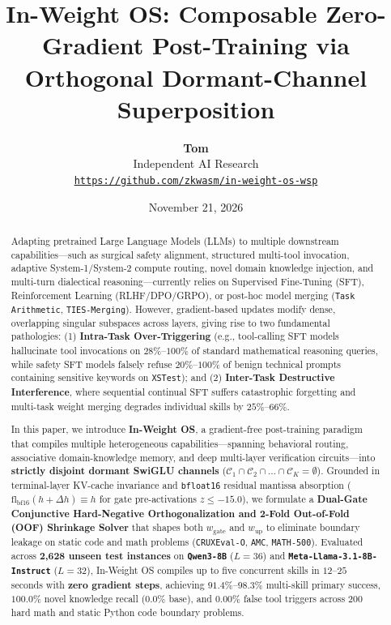 \documentclass[10pt,twocolumn]{article}
\title{\LARGE \textbf{In-Weight OS: Composable Zero-Gradient Post-Training via Orthogonal Dormant-Channel Superposition}}
\author{
  \textbf{Tom} \\
  Independent AI Research \\
  \texttt{\href{https://github.com/zkwasm/in-weight-os-wsp}{https://github.com/zkwasm/in-weight-os-wsp}}
}
\date{November 21, 2026}
\begin{document}
\maketitle

\begin{abstract}
Adapting pretrained Large Language Models (LLMs) to multiple downstream capabilities---such as surgical safety alignment, structured multi-tool invocation, adaptive System-1/System-2 compute routing, novel domain knowledge injection, and multi-turn dialectical reasoning---currently relies on Supervised Fine-Tuning (SFT), Reinforcement Learning (RLHF/DPO/GRPO), or post-hoc model merging (\texttt{Task Arithmetic}, \texttt{TIES-Merging}). However, gradient-based updates modify dense, overlapping singular subspaces across layers, giving rise to two fundamental pathologies: (1) \textbf{Intra-Task Over-Triggering} (e.g., tool-calling SFT models hallucinate tool invocations on $28\%\text{--}100\%$ of standard mathematical reasoning queries, while safety SFT models falsely refuse $20\%\text{--}100\%$ of benign technical prompts containing sensitive keywords on \texttt{XSTest}); and (2) \textbf{Inter-Task Destructive Interference}, where sequential continual SFT suffers catastrophic forgetting and multi-task weight merging degrades individual skills by $25\%\text{--}66\%$.

In this paper, we introduce \textbf{In-Weight OS}, a gradient-free post-training paradigm that compiles multiple heterogeneous capabilities---spanning behavioral routing, associative domain-knowledge memory, and deep multi-layer verification circuits---into \textbf{strictly disjoint dormant SwiGLU channels} ($\mathcal{C}_1 \cap \mathcal{C}_2 \cap \dots \cap \mathcal{C}_K = \emptyset$). Grounded in terminal-layer KV-cache invariance and \texttt{bfloat16} residual mantissa absorption ($\mathrm{fl}_{\mathrm{bf16}}(h + \Delta h) \equiv h$ for gate pre-activations $z \le -15.0$), we formulate a \textbf{Dual-Gate Conjunctive Hard-Negative Orthogonalization and 2-Fold Out-of-Fold (OOF) Shrinkage Solver} that shapes both $w_{\mathrm{gate}}$ and $w_{\mathrm{up}}$ to eliminate boundary leakage on static code and math problems (\texttt{CRUXEval-O}, \texttt{AMC}, \texttt{MATH-500}). Evaluated across \textbf{2,628 unseen test instances} on \textbf{\texttt{Qwen3-8B}} ($L=36$) and \textbf{\texttt{Meta-Llama-3.1-8B-Instruct}} ($L=32$), In-Weight OS compiles up to five concurrent skills in $12\text{--}25$ seconds with \textbf{zero gradient steps}, achieving $91.4\%\text{--}98.3\%$ multi-skill primary success, $\mathbf{100.0\%}$ novel knowledge recall ($0.0\%$ base), and $\mathbf{0.00\%}$ false tool triggers across $200$ hard math and static Python code boundary problems.
\end{abstract}
\end{document}
